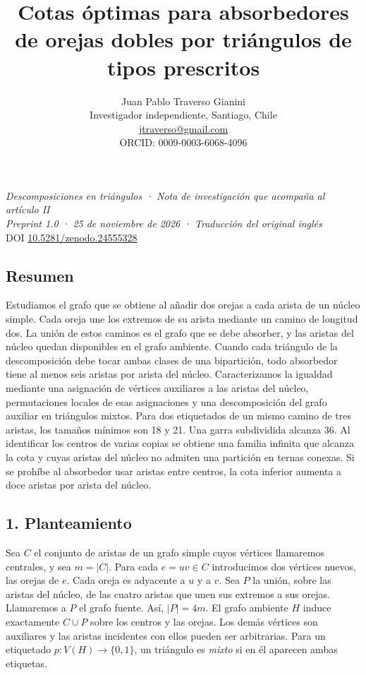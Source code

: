 \documentclass[spanish,11pt,a4paper]{article}
\title{Cotas óptimas para absorbedores de orejas dobles por triángulos de tipos prescritos}
\author{Juan Pablo Traverso Gianini\\
\small Investigador independiente, Santiago, Chile\\
\small \href{mailto:jtraverso@gmail.com}{jtraverso@gmail.com}\\
\small ORCID: 0009-0003-6068-4096}
\date{}
\begin{document}
\raggedbottom
\maketitle
\emph{Descomposiciones en triángulos · Nota de investigación que acompaña al artículo II}\\
\emph{Preprint 1.0 · 25 de noviembre de 2026 · Traducción del original inglés}\\
DOI \href{https://doi.org/10.5281/zenodo.24555328}{10.5281/zenodo.24555328}

\subsection{Resumen}\label{resumen}

Estudiamos el grafo que se obtiene al añadir dos orejas a cada arista de un núcleo simple. Cada oreja une los extremos de su arista mediante un camino de longitud dos. La unión de estos caminos es el grafo que se debe absorber, y las aristas del núcleo quedan disponibles en el grafo ambiente. Cuando cada triángulo de la descomposición debe tocar ambas clases de una bipartición, todo absorbedor tiene al menos seis aristas por arista del núcleo. Caracterizamos la igualdad mediante una asignación de vértices auxiliares a las aristas del núcleo, permutaciones locales de esas asignaciones y una descomposición del grafo auxiliar en triángulos mixtos. Para dos etiquetados de un mismo camino de tres aristas, los tamaños mínimos son 18 y 21. Una garra subdividida alcanza 36. Al identificar los centros de varias copias se obtiene una familia infinita que alcanza la cota y cuyas aristas del núcleo no admiten una partición en ternas conexas. Si se prohíbe al absorbedor usar aristas entre centros, la cota inferior aumenta a doce aristas por arista del núcleo.

\subsection{1. Planteamiento}\label{planteamiento}

Sea \(C\) el conjunto de aristas de un grafo simple cuyos vértices llamaremos centrales, y sea \(m=|C|\). Para cada \(e=uv\in C\) introducimos dos vértices nuevos, las orejas de \(e\). Cada oreja es adyacente a \(u\) y a \(v\). Sea \(P\) la unión, sobre las aristas del núcleo, de las cuatro aristas que unen sus extremos a sus orejas. Llamaremos a \(P\) el grafo fuente. Así, \(|P|=4m\). El grafo ambiente \(H\) induce exactamente \(C\cup P\) sobre los centros y las orejas. Los demás vértices son auxiliares y las aristas incidentes con ellos pueden ser arbitrarias. Para un etiquetado \(p\colon V(H)\to\{0,1\}\), un triángulo es \emph{mixto} si en él aparecen ambas etiquetas.
\end{document}
